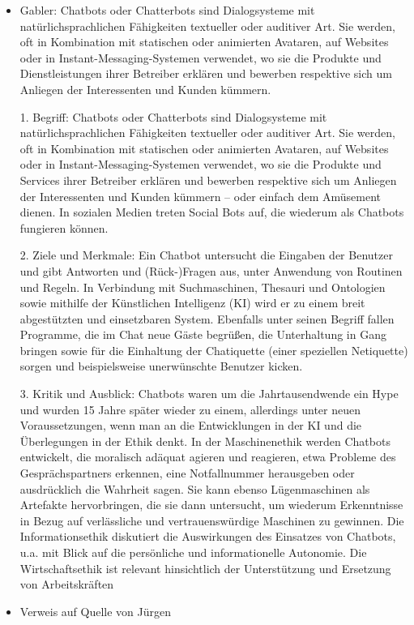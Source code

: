\begin{itemize}
\item Gabler: Chatbots oder Chatterbots sind Dialogsysteme mit natürlichsprachlichen Fähigkeiten textueller oder auditiver Art. Sie werden, oft in Kombination mit statischen oder animierten Avataren, auf Websites oder in Instant-Messaging-Systemen verwendet, wo sie die Produkte und Dienstleistungen ihrer Betreiber erklären und bewerben respektive sich um Anliegen der Interessenten und Kunden kümmern.

1. Begriff: Chatbots oder Chatterbots sind Dialogsysteme mit natürlichsprachlichen Fähigkeiten textueller oder auditiver Art. Sie werden, oft in Kombination mit statischen oder animierten Avataren, auf Websites oder in Instant-Messaging-Systemen verwendet, wo sie die Produkte und Services ihrer Betreiber erklären und bewerben respektive sich um Anliegen der Interessenten und Kunden kümmern – oder einfach dem Amüsement dienen. In sozialen Medien treten Social Bots auf, die wiederum als Chatbots fungieren können.

2. Ziele und Merkmale: Ein Chatbot untersucht die Eingaben der Benutzer und gibt Antworten und (Rück-)Fragen aus, unter Anwendung von Routinen und Regeln. In Verbindung mit Suchmaschinen, Thesauri und Ontologien sowie mithilfe der Künstlichen Intelligenz (KI) wird er zu einem breit abgestützten und einsetzbaren System. Ebenfalls unter seinen Begriff fallen Programme, die im Chat neue Gäste begrüßen, die Unterhaltung in Gang bringen sowie für die Einhaltung der Chatiquette (einer speziellen Netiquette) sorgen und beispielsweise unerwünschte Benutzer kicken.

3. Kritik und Ausblick: Chatbots waren um die Jahrtausendwende ein Hype und wurden 15 Jahre später wieder zu einem, allerdings unter neuen Voraussetzungen, wenn man an die Entwicklungen in der KI und die Überlegungen in der Ethik denkt. In der Maschinenethik werden Chatbots entwickelt, die moralisch adäquat agieren und reagieren, etwa Probleme des Gesprächspartners erkennen, eine Notfallnummer herausgeben oder ausdrücklich die Wahrheit sagen. Sie kann ebenso Lügenmaschinen als Artefakte hervorbringen, die sie dann untersucht, um wiederum Erkenntnisse in Bezug auf verlässliche und vertrauenswürdige Maschinen zu gewinnen. Die Informationsethik diskutiert die Auswirkungen des Einsatzes von Chatbots, u.a. mit Blick auf die persönliche und informationelle Autonomie. Die Wirtschaftsethik ist relevant hinsichtlich der Unterstützung und Ersetzung von Arbeitskräften

\item Verweis auf Quelle von Jürgen

\end{itemize}

